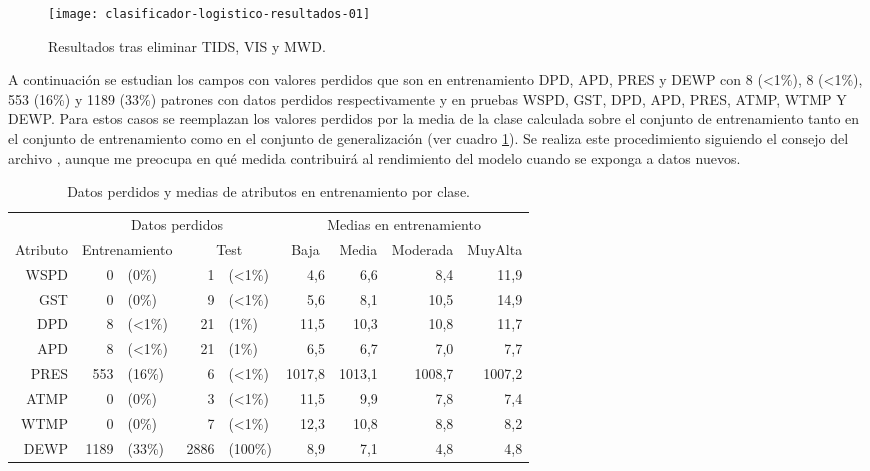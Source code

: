 \begin{figure}[ht]
    \centering
    \texttt{[image: clasificador-logistico-resultados-01]}
    \caption{Resultados tras eliminar TIDS, VIS y MWD.}
    \label{fig:clasificador-logistico-resultados-01}
\end{figure}

A continuación se estudian los campos con valores perdidos que son en entrenamiento DPD, APD, PRES y DEWP con 8 (<1\%), 8 (<1\%), 553 (16\%) y 1189 (33\%) patrones con datos perdidos respectivamente y en pruebas WSPD, GST, DPD, APD, PRES, ATMP, WTMP Y DEWP. Para estos casos se reemplazan los valores perdidos por la media de la clase calculada sobre el conjunto de entrenamiento tanto en el conjunto de entrenamiento como en el conjunto de generalización (ver cuadro \ref{tab:medias-por-clase}). Se realiza este procedimiento siguiendo el consejo del archivo , aunque me preocupa en qué medida contribuirá al rendimiento del modelo cuando se exponga a datos nuevos.

\begin{table}[ht]
    \centering
    \begin{tabular}{|r|rlrl|rrrr|}
    \hline
      \multicolumn{1}{|c|}{} &
      \multicolumn{4}{c|}{Datos perdidos} &
      \multicolumn{4}{c|}{Medias en entrenamiento} \\
      \multicolumn{1}{|c|}{Atributo} &
      \multicolumn{2}{c}{Entrenamiento} &
      \multicolumn{2}{c|}{Test} &
      \multicolumn{1}{c}{Baja} &
      \multicolumn{1}{c}{Media} &
      \multicolumn{1}{c}{Moderada} &
      \multicolumn{1}{c|}{MuyAlta} \\ \hline
      WSPD & 0    & (0\%)  & 1    & (<1\%)  & 4,6    & 6,6    & 8,4    & 11,9   \\ 
      GST  & 0    & (0\%)  & 9    & (<1\%)  & 5,6    & 8,1    & 10,5   & 14,9   \\
      DPD  & 8    & (<1\%) & 21   & (1\%)   & 11,5   & 10,3   & 10,8   & 11,7   \\
      APD  & 8    & (<1\%) & 21   & (1\%)   & 6,5    & 6,7    & 7,0    & 7,7    \\
      PRES & 553  & (16\%) & 6    & (<1\%)  & 1017,8 & 1013,1 & 1008,7 & 1007,2 \\
      ATMP & 0    & (0\%)  & 3    & (<1\%)  & 11,5   & 9,9    & 7,8    & 7,4    \\
      WTMP & 0    & (0\%)  & 7    & (<1\%)  & 12,3   & 10,8   & 8,8    & 8,2    \\
      DEWP & 1189 & (33\%) & 2886 & (100\%) & 8,9    & 7,1    & 4,8    & 4,8    \\\hline
    \end{tabular}
    \caption{Datos perdidos y medias de atributos en entrenamiento por clase.}
    \label{tab:medias-por-clase}
\end{table}

